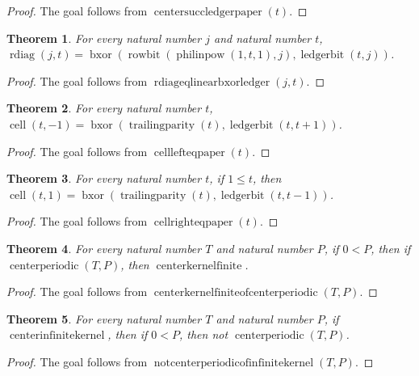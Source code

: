 \documentclass[11pt]{article}
\newtheorem{theorem}{Theorem}[section]
\theoremstyle{definition}
\begin{document}
\begin{proof}
The goal follows from \(\operatorname{centersuccledgerpaper}(t)\).
\end{proof}
\begin{theorem}
\label{ll:observations:rdiag-eq-linear-bxor-ledger}
For every natural number \(j\) and natural number \(t\), \(\operatorname{rdiag}(j, t) = \operatorname{bxor}(\operatorname{rowbit}(\operatorname{philinpow}(1, t, 1), j), \operatorname{ledgerbit}(t, j))\).
\end{theorem}
\begin{proof}
The goal follows from \(\operatorname{rdiageqlinearbxorledger}(j, t)\).
\end{proof}
\begin{theorem}
\label{ll:observations:cell-left-eq-paper}
For every natural number \(t\), \(\operatorname{cell}(t, -1) = \operatorname{bxor}(\operatorname{trailingparity}(t), \operatorname{ledgerbit}(t, t + 1))\).
\end{theorem}
\begin{proof}
The goal follows from \(\operatorname{celllefteqpaper}(t)\).
\end{proof}
\begin{theorem}
\label{ll:observations:cell-right-eq-paper}
For every natural number \(t\), if \(1 \le t\), then \(\operatorname{cell}(t, 1) = \operatorname{bxor}(\operatorname{trailingparity}(t), \operatorname{ledgerbit}(t, t - 1))\).
\end{theorem}
\begin{proof}
The goal follows from \(\operatorname{cellrighteqpaper}(t)\).
\end{proof}
\begin{theorem}
\label{ll:observations:center-kernel-finite-of-center-periodic}
For every natural number \(T\) and natural number \(P\), if \(0 < P\), then if \(\operatorname{centerperiodic}(T, P)\), then \(\operatorname{centerkernelfinite}\).
\end{theorem}
\begin{proof}
The goal follows from \(\operatorname{centerkernelfiniteofcenterperiodic}(T, P)\).
\end{proof}
\begin{theorem}
\label{ll:observations:not-center-periodic-of-infinite-kernel}
For every natural number \(T\) and natural number \(P\), if \(\operatorname{centerinfinitekernel}\), then if \(0 < P\), then not \(\operatorname{centerperiodic}(T, P)\).
\end{theorem}
\begin{proof}
The goal follows from \(\operatorname{notcenterperiodicofinfinitekernel}(T, P)\).
\end{proof}
\end{document}
